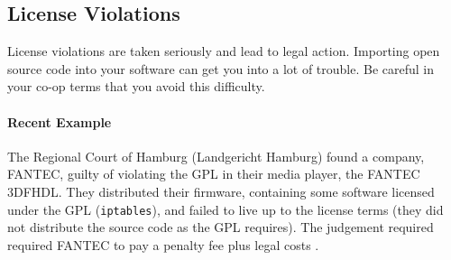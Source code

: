 \subsection*{License Violations}

License violations are taken seriously and lead to legal action. Importing open source code into your software can get you into a lot of trouble. Be careful in your co-op terms that you avoid this difficulty.

\paragraph{Recent Example} The Regional Court of Hamburg (Landgericht Hamburg) found a company, FANTEC, guilty of violating the GPL in their media player, the FANTEC 3DFHDL. They distributed their firmware, containing some software licensed under the GPL (\texttt{iptables}), and failed to live up to the license terms (they did not distribute the source code as the GPL requires). The judgement required required FANTEC to pay a penalty fee plus legal costs \cite{gpl:violations}.





